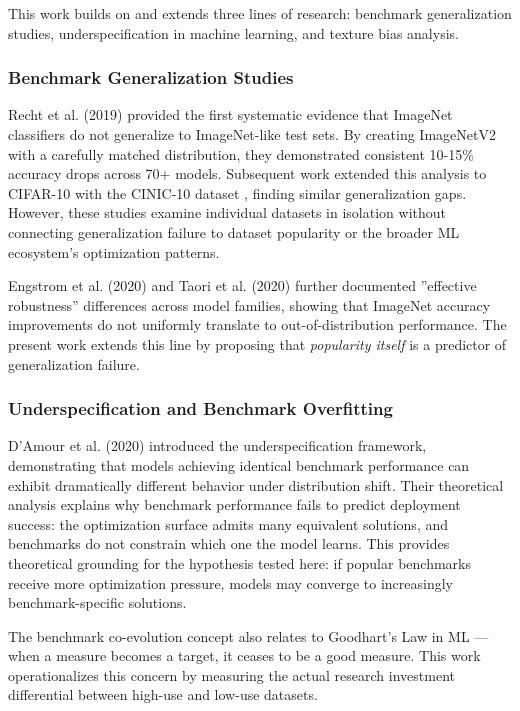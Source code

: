 
This work builds on and extends three lines of research: benchmark generalization studies, underspecification in machine learning, and texture bias analysis.

\subsubsection{Benchmark Generalization Studies}

Recht et al. (2019) provided the first systematic evidence that ImageNet classifiers do not generalize to ImageNet-like test sets. By creating ImageNetV2 with a carefully matched distribution, they demonstrated consistent 10-15\% accuracy drops across 70+ models. Subsequent work extended this analysis to CIFAR-10 with the CINIC-10 dataset \citep{darlow2018cinic}, finding similar generalization gaps. However, these studies examine individual datasets in isolation without connecting generalization failure to dataset popularity or the broader ML ecosystem's optimization patterns.

Engstrom et al. (2020) and Taori et al. (2020) further documented ''effective robustness'' differences across model families, showing that ImageNet accuracy improvements do not uniformly translate to out-of-distribution performance. The present work extends this line by proposing that \textit{popularity itself} is a predictor of generalization failure.

\subsubsection{Underspecification and Benchmark Overfitting}

D'Amour et al. (2020) introduced the underspecification framework, demonstrating that models achieving identical benchmark performance can exhibit dramatically different behavior under distribution shift. Their theoretical analysis explains why benchmark performance fails to predict deployment success: the optimization surface admits many equivalent solutions, and benchmarks do not constrain which one the model learns. This provides theoretical grounding for the hypothesis tested here: if popular benchmarks receive more optimization pressure, models may converge to increasingly benchmark-specific solutions.

The benchmark co-evolution concept also relates to Goodhart's Law in ML \citep{thomas2022reliance}---when a measure becomes a target, it ceases to be a good measure. This work operationalizes this concern by measuring the actual research investment differential between high-use and low-use datasets.

